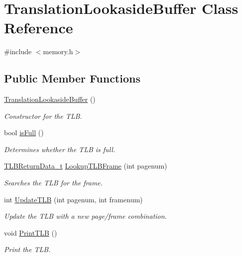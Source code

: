 \hypertarget{classTranslationLookasideBuffer}{}\section{Translation\+Lookaside\+Buffer Class Reference}
\label{classTranslationLookasideBuffer}


{\ttfamily \#include $<$memory.\+h$>$}

\subsection*{Public Member Functions}
\begin{DoxyCompactItemize}
\item 
\hyperlink{classTranslationLookasideBuffer_ad6df9fde44600dedcde0a0d7542e357a}{Translation\+Lookaside\+Buffer} ()
\begin{DoxyCompactList}\small\item\em Constructor for the T\+LB. \end{DoxyCompactList}\item 
bool \hyperlink{classTranslationLookasideBuffer_a6416b56aa9b1593b602281f3a81af091}{is\+Full} ()
\begin{DoxyCompactList}\small\item\em Determines whether the T\+LB is full. \end{DoxyCompactList}\item 
\hyperlink{structTLBReturnData__t}{T\+L\+B\+Return\+Data\+\_\+t} \hyperlink{classTranslationLookasideBuffer_a411659ccd7cb5b72a165bc69cc353e0a}{Lookup\+T\+L\+B\+Frame} (int pagenum)
\begin{DoxyCompactList}\small\item\em Searches the T\+LB for the frame. \end{DoxyCompactList}\item 
int \hyperlink{classTranslationLookasideBuffer_a68fe2b0deb2abb9854764471d7c2cba3}{Update\+T\+LB} (int pagenum, int framenum)
\begin{DoxyCompactList}\small\item\em Update the T\+LB with a new page/frame combination. \end{DoxyCompactList}\item 
void \hyperlink{classTranslationLookasideBuffer_a1f92817ce0487d710c6ef5b0176dd358}{Print\+T\+LB} ()
\begin{DoxyCompactList}\small\item\em Print the T\+LB. \end{DoxyCompactList}\end{DoxyCompactItemize}


